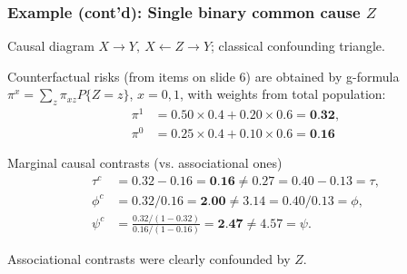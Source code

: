 \documentclass[12pt,dvipsnames,t,aspectratio=169, handout%
]{beamer}
\begin{document}
\begin{frame}
\frametitle{\large Example (cont'd): Single binary common cause $Z$}

\bi
\item Causal diagram $X \to Y, \ X \leftarrow Z \to Y$;  classical confounding triangle.
\pause
\medskip
\item 
Counterfactual risks (from items on slide 6) are obtained by g-formula
$ \pi^x = \sum_z \pi_{xz} P\{ Z=z\} $, $x=0,1$, with weights from total population: 
\begin{align*}
  \pi^1 & = 0.50 \times 0.4 + 0.20 \times 0.6 = \textbf{0.32}, \\
	\pi^0 & = 0.25 \times 0.4 + 0.10 \times 0.6 = \textbf{0.16}
\end{align*}
\pause
\item
Marginal causal contrasts (vs. associational ones)
\begin{align*}
   \tau^c & = 0.32 - 0.16 = \textbf{0.16} \neq 0.27 = 0.40 - 0.13 =  \tau, \\
	 \phi^c & = 0.32/0.16 = \textbf{2.00} \neq 3.14 = 0.40/0.13 =  \phi, \\
	 \psi^c & = \frac{0.32/(1-0.32)}{0.16/(1-0.16)} = \textbf{2.47}
	                \neq 4.57 = \psi.
\end{align*}
\pause
\item
Associational contrasts were clearly confounded by $Z$.
\ei 

\end{frame}

\end{document}

